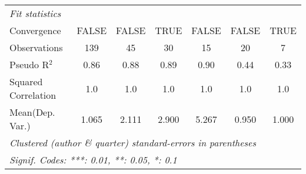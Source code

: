 \begin{tabular}{lcccccc}
   \midrule
   \emph{Fit statistics}\\
   Convergence                                                &FALSE          & FALSE  & TRUE         & FALSE        & FALSE         & TRUE\\  
   Observations                                               & 139           & 45     & 30           & 15           & 20            & 7\\  
   Pseudo R$^2$                                               & 0.86          & 0.88   & 0.89         & 0.90         & 0.44          & 0.33\\  
   Squared Correlation                                        & 1.0           & 1.0    & 1.0          & 1.0          & 1.0           & 1.0\\  
Mean(Dep. Var.) & 1.065 & 2.111 & 2.900 & 5.267 & 0.950 & 1.000 \\
   \midrule \midrule
   \multicolumn{7}{l}{\emph{Clustered (author \& quarter) standard-errors in parentheses}}\\
   \multicolumn{7}{l}{\emph{Signif. Codes: ***: 0.01, **: 0.05, *: 0.1}}\\
\end{tabular}
\par\endgroup
